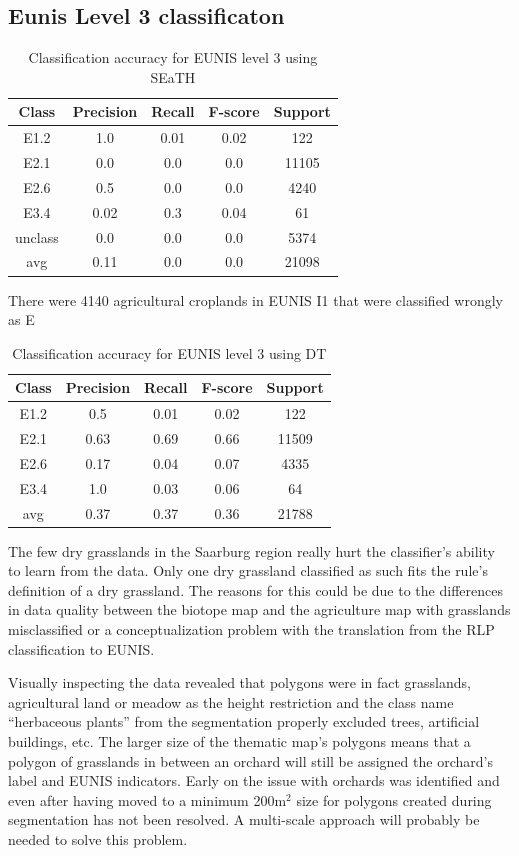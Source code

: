 \documentclass[authoryear, review,12pt,number]{elsarticle}
\begin{document}
\subsection{Eunis Level 3 classificaton}
\begin{table}
\centering
\begin{tabular}{c c c c c}
Class & Precision & Recall & F-score & Support\\
\hline
E1.2 & 1.0 & 0.01 & 0.02 & 122\\
E2.1 & 0.0 & 0.0 & 0.0 & 11105\\
E2.6 & 0.5 & 0.0 & 0.0 & 4240\\
E3.4 & 0.02 & 0.3 & 0.04 & 61\\
unclass & 0.0 & 0.0 & 0.0 & 5374\\
avg & 0.11 & 0.0 & 0.0 & 21098\\
\end{tabular}
\caption{Classification accuracy for EUNIS level 3 using SEaTH}
\end{table}
There were 4140 agricultural croplands in EUNIS I1 that were classified wrongly 
as E 
\begin{table}
\centering
\begin{tabular}{c c c c c}
Class & Precision & Recall & F-score & Support\\
\hline
E1.2 & 0.5 & 0.01 & 0.02 & 122\\
E2.1 & 0.63 & 0.69 & 0.66 & 11509\\
E2.6 & 0.17 & 0.04 & 0.07 & 4335\\
E3.4 & 1.0 & 0.03 & 0.06 & 64\\
avg & 0.37 & 0.37 & 0.36 & 21788\\
\end{tabular}
\caption{Classification accuracy for EUNIS level 3 using DT}
\end{table}

The few dry grasslands in the Saarburg region really hurt the classifier's 
ability to learn from the data. Only one dry grassland classified as such fits 
the rule's definition of a dry grassland. The reasons for this could be due to 
the differences in data quality between the biotope map and the agriculture map 
with grasslands misclassified or a conceptualization problem with the 
translation from the RLP classification to EUNIS. 

Visually inspecting the data revealed that polygons were in fact grasslands, 
agricultural land or meadow as the height restriction and the class name 
``herbaceous plants'' from the segmentation properly excluded trees, artificial 
buildings, etc. The larger size of the thematic map's 
polygons means that a polygon of grasslands in between an orchard will still be 
assigned the orchard's label and EUNIS indicators. Early on the issue with
orchards was identified and even after having moved to a minimum 200m$^{2}$ size for
polygons created during segmentation has not been resolved. A multi-scale
approach will probably be needed to solve this problem.
\end{document}
